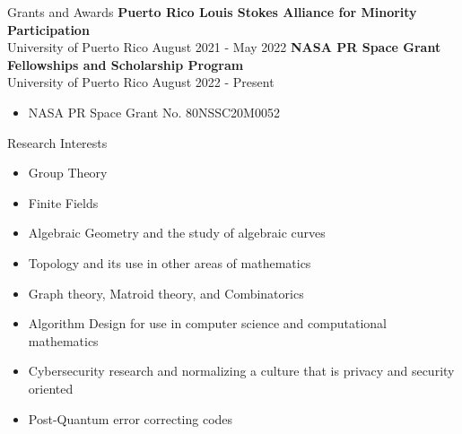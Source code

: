\documentclass{resume} %
\begin{document}
\begin{rSection}{Grants and Awards}
    \textbf{Puerto Rico Louis Stokes Alliance for Minority Participation} \\
    University of Puerto Rico \hfill{August 2021 - May 2022}
    \textbf{NASA PR Space Grant Fellowships and Scholarship Program} \\
    University of Puerto Rico \hfill{August 2022 - Present}
    \begin{itemize}
        \item NASA PR Space Grant No. 80NSSC20M0052
    \end{itemize}
\end{rSection}

\pagebreak

\begin{rSection}{Research Interests}
    \begin{multicols}{2}
    \begin{itemize}
        \item Group Theory

        \item Finite Fields

        \item Algebraic Geometry and the study of algebraic curves

        \item Topology and its use in other areas of mathematics

        \item Graph theory, Matroid theory, and Combinatorics

        \item Algorithm Design for use in computer science and computational
            mathematics

        \item Cybersecurity research and normalizing a culture that is privacy
            and security oriented

        \item Post-Quantum error correcting codes
    \end{itemize}
    \end{multicols}
\end{rSection}
\end{document}
